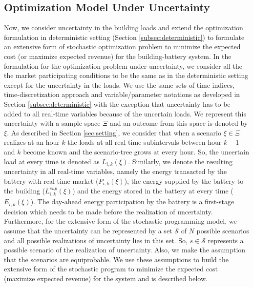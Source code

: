 \documentclass[11pt,twoside]{article}
\begin{document}
\subsection{Optimization Model Under Uncertainty} \label{subsec:opt_unc}
Now, we consider uncertainty in the building loads and extend the optimization formulation in deterministic setting (Section \ref{subsec:deterministic}) to formulate an extensive form of stochastic optimization problem to minimize the expected cost (or maximize expected revenue) for the building-battery system. In the formulation for the optimization problem under uncertainty, we consider all the the market participating conditions to be the same as in the deterministic setting except for the uncertainty in the loads. We use the same sets of time indices, time-discretization approach and variable/parameter notations as developed in Section \ref{subsec:deterministic} with the exception that uncertainty has to be added to all real-time variables because of the uncertain loads. We represent this uncertainty with a sample space $\Xi$ and an outcome from this space is denoted by $\xi$. As described in Section \ref{sec:setting}, we consider that when a scenario $\xi \in \Xi$ realizes at an hour $k$ the loads at all real-time subintervals between hour $k-1$ and $k$ become known and the scenario-tree grows at every hour. So, the uncertain load at every time is denoted as $L_{i,k}(\xi)$. Similarly, we denote the resulting uncertainty in all real-time variables, namely the energy transacted by the battery with real-time market ($P_{i,k}(\xi)$), the energy supplied by the battery to the building ($L^{sup}_{i,k}(\xi)$) and the energy stored in the battery at every time ($E_{i,k}(\xi)$). The day-ahead energy participation by the battery is a first-stage decision which needs to be made before the realization of uncertainty. Furthermore, for the extensive form of the stochastic programming model, we assume that the uncertainty can be represented by a set $\mathcal{S}$ of $N$ possible scenarios  and all possible realizations of uncertainty lies in this set. So, $s \in \mathcal{S}$ represents a possible scenario of the realization of uncertainty. Also, we make the assumption that the scenarios are equiprobable. We use these assumptions to build the extensive form of the stochastic program to minimize the expected cost (maximize expected revenue) for the system and is described below.
\end{document}
